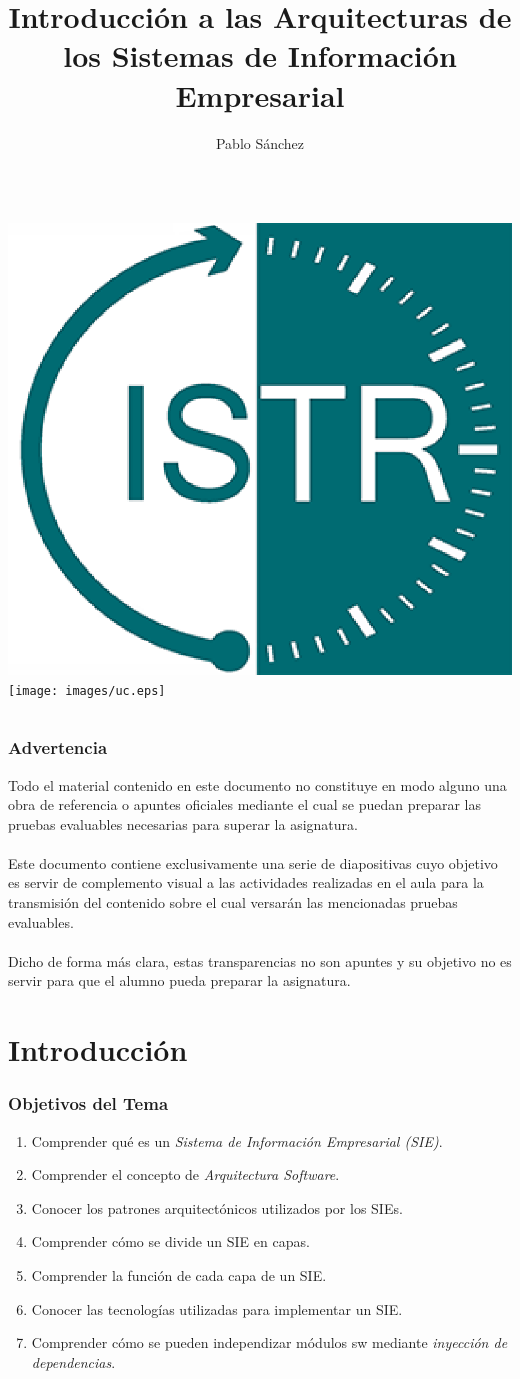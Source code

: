 \documentclass[a4paper,t,xcolor=pst,dvips,colortheme]{beamer}
\title[Arquitecturas SIE]{Introducción a las Arquitecturas de los Sistemas de Información Empresarial}
\author[Pablo Sánchez]{\alert{Pablo Sánchez}}
\institute[IIE]{
		   Dpto. Ingeniería Informática y Electrónica \\
		   Universidad de Cantabria \\
		   Santander (Cantabria, España) \\
		   \texttt{p.sanchez@unican.es}
}
\date{}
\begin{document}
\begin{frame}[c]
	\titlepage
	\begin{columns}
			\centering
    		\includegraphics[width=.28\textwidth,keepaspectratio=true]{images/istr.eps}
			\centering
			\texttt{[image: images/uc.eps]}
	\end{columns}
\end{frame}

\begin{frame}[c]
    \frametitle{\alert{Advertencia}}
    \begin{center}
        Todo el material contenido en este documento no constituye en modo alguno una obra de referencia o apuntes oficiales mediante el cual se puedan preparar las pruebas evaluables necesarias para superar la asignatura. \ \\
        \ \\
        Este documento contiene exclusivamente una serie de diapositivas cuyo objetivo es servir de complemento visual a las actividades realizadas en el aula para la transmisión del contenido sobre el cual versarán las mencionadas pruebas evaluables.  \ \\
        \ \\
        Dicho de forma más clara, \alert{estas transparencias no son apuntes y su objetivo no es servir para que el alumno pueda preparar la asignatura.}
    \end{center}
\end{frame}

\section{Introducción}

\begin{frame}[c]
    \frametitle{Objetivos del Tema}
    \begin{enumerate}[<+->]
         \item Comprender qué es un \emph{Sistema de Información Empresarial (SIE)}.
         \item Comprender el concepto de \emph{Arquitectura Software}.
         \item Conocer los patrones arquitectónicos utilizados por los SIEs.
         \item Comprender cómo se divide un SIE en capas.
         \item Comprender la función de cada capa de un SIE.
         \item Conocer las tecnologías utilizadas para implementar un SIE.
         \item Comprender cómo se pueden independizar módulos sw mediante \emph{inyección de dependencias}.
    \end{enumerate}
\end{frame}
\end{document}
